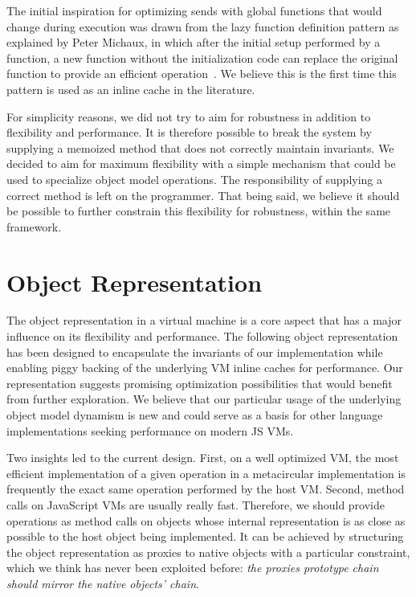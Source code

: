 The initial inspiration for optimizing sends with global functions that would
change during execution was drawn from the lazy function definition pattern as
explained by Peter Michaux, in which after the initial setup performed by a
function, a new function without the initialization code can replace the
original function to provide an efficient
operation~\cite{michaux:LazyFunctionDefinitionPattern}. We believe this is the
first time this pattern is used as an inline cache in the literature.

For simplicity reasons, we did not try to aim for robustness in addition to
flexibility and performance. It is therefore possible to break the system by
supplying a memoized method that does not correctly maintain invariants. We
decided to aim for maximum flexibility with a simple mechanism that could be
used to specialize object model operations. The responsibility of supplying a
correct method is left on the programmer. That being said, we believe it should
be possible to further constrain this flexibility for robustness, within the
same framework.

\section{Object Representation}
\label{sec:ObjectRepresentation}

The object representation in a virtual machine is a core aspect that has a
major influence on its flexibility and performance. The following object
representation has been designed to encapsulate the invariants of our
implementation while enabling piggy backing of the underlying VM inline
caches for performance. Our representation suggests promising optimization
possibilities that would benefit from further exploration. We believe that our
particular usage of the underlying object model dynamism is new and could serve
as a basis for other language implementations seeking performance on modern JS
VMs.

Two insights led to the current design. First, on a well optimized VM, the most
efficient implementation of a given operation in a metacircular implementation
is frequently the exact same operation performed by the host VM. Second, method
calls on JavaScript VMs are usually really fast. Therefore, we should provide
operations as method calls on objects whose internal representation is as close
as possible to the host object being implemented. It can be achieved by
structuring the object representation as proxies to native objects with a
particular constraint, which we think has never been exploited before:
\textit{the proxies prototype chain should mirror the native objects' chain}.

